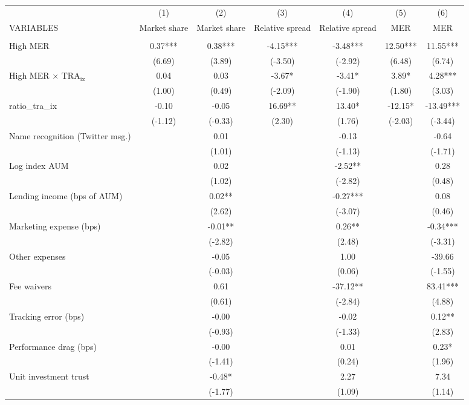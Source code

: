 \documentclass[]{article}
\begin{document}
\begin{tabular}{lcccccc} \hline
 & (1) & (2) & (3) & (4) & (5) & (6) \\
VARIABLES & Market share & Market share & Relative spread & Relative spread & MER & MER \\ \hline
 &  &  &  &  &  &  \\
High MER & 0.37*** & 0.38*** & -4.15*** & -3.48*** & 12.50*** & 11.55*** \\
 & (6.69) & (3.89) & (-3.50) & (-2.92) & (6.48) & (6.74) \\
High MER $\times$ $\text{TRA}_\text{ix}$ & 0.04 & 0.03 & -3.67* & -3.41* & 3.89* & 4.28*** \\
 & (1.00) & (0.49) & (-2.09) & (-1.90) & (1.80) & (3.03) \\
ratio\_tra\_ix & -0.10 & -0.05 & 16.69** & 13.40* & -12.15* & -13.49*** \\
 & (-1.12) & (-0.33) & (2.30) & (1.76) & (-2.03) & (-3.44) \\
Name recognition (Twitter msg.) &  & 0.01 &  & -0.13 &  & -0.64 \\
 &  & (1.01) &  & (-1.13) &  & (-1.71) \\
Log index AUM &  & 0.02 &  & -2.52** &  & 0.28 \\
 &  & (1.02) &  & (-2.82) &  & (0.48) \\
Lending income (bps of AUM) &  & 0.02** &  & -0.27*** &  & 0.08 \\
 &  & (2.62) &  & (-3.07) &  & (0.46) \\
Marketing expense (bps) &  & -0.01** &  & 0.26** &  & -0.34*** \\
 &  & (-2.82) &  & (2.48) &  & (-3.31) \\
Other expenses &  & -0.05 &  & 1.00 &  & -39.66 \\
 &  & (-0.03) &  & (0.06) &  & (-1.55) \\
Fee waivers &  & 0.61 &  & -37.12** &  & 83.41*** \\
 &  & (0.61) &  & (-2.84) &  & (4.88) \\
Tracking error (bps) &  & -0.00 &  & -0.02 &  & 0.12** \\
 &  & (-0.93) &  & (-1.33) &  & (2.83) \\
Performance drag (bps) &  & -0.00 &  & 0.01 &  & 0.23* \\
 &  & (-1.41) &  & (0.24) &  & (1.96) \\
Unit investment trust &  & -0.48* &  & 2.27 &  & 7.34 \\
 &  & (-1.77) &  & (1.09) &  & (1.14) \\

\end{tabular}
\end{document}
